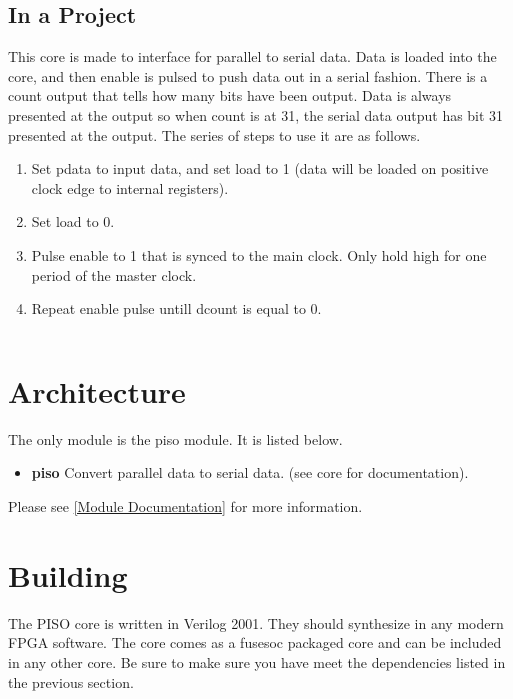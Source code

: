 

\subsection{In a Project}
\par
This core is made to interface for parallel to serial data. Data is loaded into the core, and then enable is pulsed to
push data out in a serial fashion. There is a count output that tells how many bits have been output. Data is always
presented at the output so when count is at 31, the serial data output has bit 31 presented at the output.
The series of steps to use it are as follows.
\begin{enumerate}
  \item Set pdata to input data, and set load to 1 (data will be loaded on positive clock edge to internal registers).
  \item Set load to 0.
  \item Pulse enable to 1 that is synced to the main clock. Only hold high for one period of the master clock.
  \item Repeat enable pulse untill dcount is equal to 0.
\end{enumerate}

\begin{lstlisting}[language=Verilog]
\end{lstlisting}

\section{Architecture}
\par
The only module is the piso module. It is listed below.

\begin{itemize}
  \item \textbf{piso} Convert parallel data to serial data. (see core for documentation).
\end{itemize}

Please see \ref{Module Documentation} for more information.

\section{Building}

\par
The PISO core is written in Verilog 2001. They should synthesize in any modern FPGA software. The core comes as a fusesoc packaged core and can be
included in any other core. Be sure to make sure you have meet the dependencies listed in the previous section.

